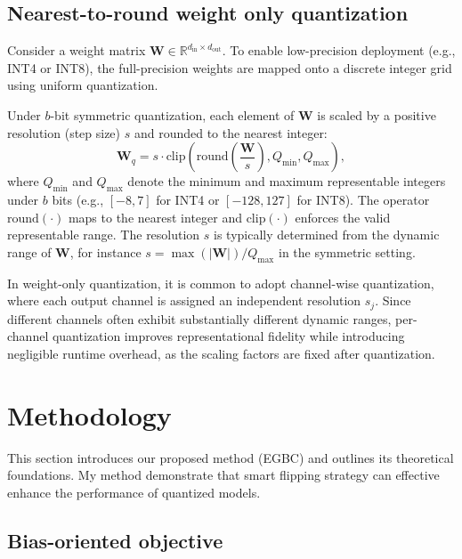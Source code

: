 \documentclass[table, 11pt]{article}
\begin{document}
\subsection{Nearest-to-round weight only quantization} \label{subsec:notations}

Consider a weight matrix $\mathbf{W} \in \mathbb{R}^{d_{\text{in}} \times d_{\text{out}}}$. To enable low-precision deployment (e.g., INT4 or INT8), the full-precision weights are mapped onto a discrete integer grid using uniform quantization.

Under $b$-bit symmetric quantization, each element of $\mathbf{W}$ is scaled by a positive resolution (step size) $s$ and rounded to the nearest integer:
\[
\mathbf{W}_q = s \cdot \mathrm{clip}\!\left(
\mathrm{round}\!\left(\frac{\mathbf{W}}{s}\right),
Q_{\min}, Q_{\max}
\right),
\]
where $Q_{\min}$ and $Q_{\max}$ denote the minimum and maximum representable integers under $b$ bits (e.g., $[-8,7]$ for INT4 or $[-128,127]$ for INT8). The operator $\mathrm{round}(\cdot)$ maps to the nearest integer and $\mathrm{clip}(\cdot)$ enforces the valid representable range. The resolution $s$ is typically determined from the dynamic range of $\mathbf{W}$, for instance $s = \max(|\mathbf{W}|)/Q_{\max}$ in the symmetric setting. 

In weight-only quantization, it is common to adopt channel-wise quantization, where each output channel is assigned an independent resolution $s_j$. Since different channels often exhibit substantially different dynamic ranges, per-channel quantization improves representational fidelity while introducing negligible runtime overhead, as the scaling factors are fixed after quantization.

\section{Methodology}

This section introduces our proposed method (EGBC) and outlines its theoretical foundations. My method demonstrate that smart flipping strategy can effective enhance the performance of quantized models.

\subsection{Bias-oriented objective}
\end{document}

